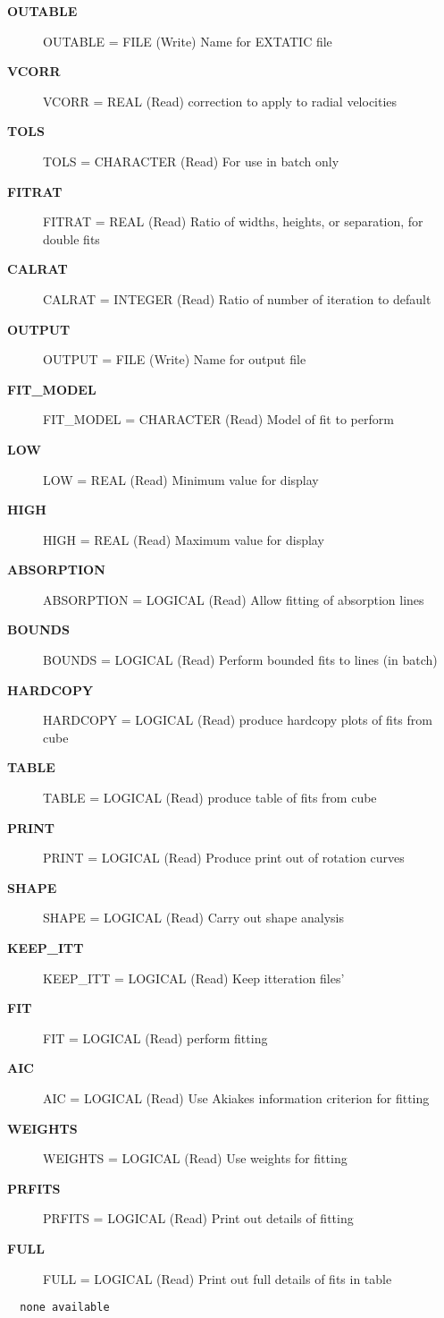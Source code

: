 \begin{description}
\begin{description}
\item [{\bf OUTABLE}]
    OUTABLE = FILE (Write)
        Name for EXTATIC file
\item [{\bf VCORR}]
    VCORR = REAL (Read)
        correction to apply to radial velocities
\item [{\bf TOLS}]
    TOLS = CHARACTER (Read)
        For use in batch only
\item [{\bf FITRAT}]
    FITRAT = REAL (Read)
        Ratio of widths, heights, or separation, for double fits
\item [{\bf CALRAT}]
    CALRAT = INTEGER (Read)
        Ratio of number of iteration to default
\item [{\bf OUTPUT}]
    OUTPUT = FILE (Write)
        Name for output file
\item [{\bf FIT_MODEL}]
    FIT_MODEL = CHARACTER (Read)
        Model of fit to perform
\item [{\bf LOW}]
    LOW = REAL (Read)
        Minimum value for display
\item [{\bf HIGH}]
    HIGH = REAL (Read)
        Maximum value for display
\item [{\bf ABSORPTION}]
    ABSORPTION = LOGICAL (Read)
        Allow fitting of absorption lines
\item [{\bf BOUNDS}]
    BOUNDS = LOGICAL (Read)
        Perform bounded fits to lines (in batch)
\item [{\bf HARDCOPY}]
    HARDCOPY = LOGICAL (Read)
        produce hardcopy plots of fits from cube
\item [{\bf TABLE}]
    TABLE = LOGICAL (Read)
        produce table of fits from cube
\item [{\bf PRINT}]
    PRINT = LOGICAL (Read)
        Produce print out of rotation curves
\item [{\bf SHAPE}]
    SHAPE = LOGICAL (Read)
        Carry out shape analysis
\item [{\bf KEEP_ITT}]
    KEEP_ITT = LOGICAL (Read)
        Keep itteration files'
\item [{\bf FIT}]
    FIT = LOGICAL (Read)
        perform fitting
\item [{\bf AIC}]
    AIC = LOGICAL (Read)
        Use Akiakes information criterion for fitting
\item [{\bf WEIGHTS}]
    WEIGHTS = LOGICAL (Read)
        Use weights for fitting
\item [{\bf PRFITS}]
    PRFITS = LOGICAL (Read)
        Print out details of fitting
\item [{\bf FULL}]
    FULL = LOGICAL (Read)
        Print out full details of fits in table
\end{description}

\item [{\bf Source comments:}]
\begin{verbatim}
  none available

\end{verbatim}
\end{description}
